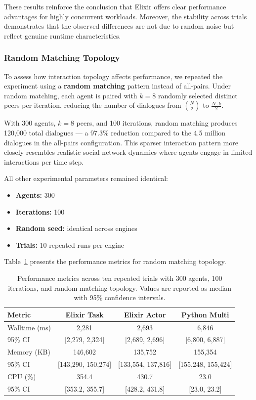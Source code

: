 \documentclass[
]{ceurart}
\begin{document}
These results reinforce the conclusion that Elixir offers clear performance advantages for highly concurrent workloads. Moreover, the stability across trials demonstrates that the observed differences are not due to random noise but reflect genuine runtime characteristics.


\subsubsection{Random Matching Topology}
To assess how interaction topology affects performance, we repeated the experiment using a \textbf{random matching} pattern instead of all-pairs. Under random matching, each agent is paired with $k=8$ randomly selected distinct peers per iteration, reducing the number of dialogues from $\binom{N}{2}$ to $\frac{N \cdot k}{2}$.

With 300 agents, $k=8$ peers, and 100 iterations, random matching produces 120,000 total dialogues --- a 97.3\% reduction compared to the 4.5 million dialogues in the all-pairs configuration. This sparser interaction pattern more closely resembles realistic social network dynamics where agents engage in limited interactions per time step.

All other experimental parameters remained identical:
\begin{itemize}
	\item \textbf{Agents:} 300
	\item \textbf{Iterations:} 100
	\item \textbf{Random seed:} identical across engines
	\item \textbf{Trials:} 10 repeated runs per engine
\end{itemize}

Table~\ref{tab:runtime_trials_random} presents the performance metrics for random matching topology.

\begin{table}[ht]
\centering
\caption{Performance metrics across ten repeated trials with 300 agents, 100 iterations, and random matching topology.
Values are reported as median with 95\% confidence intervals.}\label{tab:runtime_trials_random}
\begin{tabular}{lccc}
\toprule
Metric & Elixir Task & Elixir Actor & Python Multi \\
\midrule
Walltime (ms) & 2,281 & 2,693 & 6,846 \\
95\% CI & [2,279, 2,324] & [2,689, 2,696] & [6,800, 6,887] \\
Memory (KB) & 146,602 & 135,752 & 155,354 \\
95\% CI & [143,290, 150,274] & [133,554, 137,816] & [155,248, 155,424] \\
CPU (\%) & 354.4 & 430.7 & 23.0 \\
95\% CI & [353.2, 355.7] & [428.2, 431.8] & [23.0, 23.2] \\
\bottomrule
\end{tabular}
\end{table}
\end{document}
